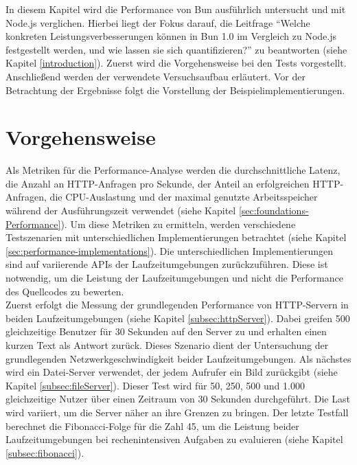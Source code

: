  \label{performanceAnalysis}
In diesem Kapitel wird die Performance von Bun ausführlich untersucht und mit Node.js verglichen. Hierbei liegt der Fokus darauf, die Leitfrage ``Welche konkreten Leistungsverbesserungen können in Bun 1.0 im Vergleich zu Node.js festgestellt werden, und wie lassen sie sich quantifizieren?'' zu beantworten (siehe Kapitel \ref{introduction}). Zuerst wird die Vorgehensweise bei den Tests vorgestellt. Anschließend werden der verwendete Versuchsaufbau erläutert. Vor der Betrachtung der Ergebnisse folgt die Vorstellung der Beispielimplementierungen.


\section{Vorgehensweise} \label{sec:performance-approach}
Als Metriken für die Performance-Analyse werden die durchschnittliche Latenz, die Anzahl an HTTP-Anfragen pro Sekunde, der Anteil an erfolgreichen HTTP-Anfragen, die CPU-Auslastung und der maximal genutzte Arbeitsspeicher während der Ausführungszeit verwendet (siehe Kapitel \ref{sec:foundations-Performance}). Um diese Metriken zu ermitteln, werden verschiedene Testszenarien mit unterschiedlichen Implementierungen betrachtet (siehe Kapitel \ref{sec:performance-implementations}). Die unterschiedlichen Implementierungen sind auf variierende APIs  der Laufzeitumgebungen zurückzuführen. Diese ist notwendig, um die Leistung der Laufzeitumgebungen und nicht die Performance des Quellcodes zu bewerten.\\

\noindent
Zuerst erfolgt die Messung der grundlegenden Performance von HTTP-Servern in beiden Laufzeitumgebungen (siehe Kapitel \ref{subsec:httpServer}). Dabei greifen 500 gleichzeitige Benutzer für 30 Sekunden auf den Server zu und erhalten einen kurzen Text als Antwort zurück. Dieses Szenario dient der Untersuchung der grundlegenden Netzwerkgeschwindigkeit beider Laufzeitumgebungen. Als nächstes wird ein Datei-Server verwendet, der jedem Aufrufer ein Bild zurückgibt (siehe Kapitel \ref{subsec:fileServer}). Dieser Test wird für 50, 250, 500 und 1.000 gleichzeitige Nutzer über einen Zeitraum von 30 Sekunden durchgeführt. Die Last wird variiert, um die Server näher an ihre Grenzen zu bringen. Der letzte Testfall berechnet die Fibonacci-Folge für die Zahl 45, um die Leistung beider Laufzeitumgebungen bei rechenintensiven Aufgaben zu evaluieren (siehe Kapitel \ref{subsec:fibonacci}).


